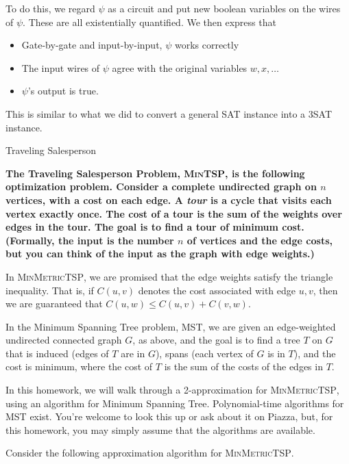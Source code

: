 \documentclass[2pt]{scrartcl}
\makeatletter
\renewcommand{\subsubsection}{\@startsection{subsubsection}{3}{0mm}
  {-1ex plus -.5ex minus -.2ex}
  {1ex plus .2ex}
{\normalfont\small\bfseries}}
\makeatother
\begin{document}
\begin{multicols}{6}
To do this, we regard $\psi$ as a circuit and put new boolean
variables on the wires of $\psi$.  These are all existentially
quantified.  We then express that
\begin{itemize}
\item Gate-by-gate and input-by-input, $\psi$ works correctly
\item The input wires of $\psi$ agree with the original variables
  $w,x,\ldots$
\item $\psi$'s output is true.
\end{itemize}
This is similar to what we did to convert a general SAT instance into
a 3SAT instance.
        
        \subsubsection{Traveling Salesperson}

            {\bf The Traveling Salesperson Problem, \textsc{MinTSP}, is the following
optimization problem.  Consider a complete undirected graph on $n$
vertices, with a cost on each edge.  A {\em tour} is a cycle that
visits each vertex exactly once.  The cost of a tour is the sum of the
weights over edges in the tour.  The goal is to find a tour of minimum
cost.  (Formally, the input is the number $n$ of vertices and the edge
costs, but you can think of the input as the graph with edge weights.)

In \textsc{MinMetricTSP}, we are promised that the edge weights
satisfy the triangle inequality.  That is, if $C(u,v)$ denotes the
cost associated with edge $u,v$, then we are guaranteed that
$C(u,w)\le C(u,v)+C(v,w)$.

In the Minimum Spanning Tree problem, \textsc{MST}, we are given an
edge-weighted undirected connected graph $G$, as above, and the goal
is to find a tree $T$ on $G$ that is induced (edges of $T$ are in
$G$), spans (each vertex of $G$ is in $T$), and the cost is minimum,
where the cost of $T$ is the sum of the costs of the edges in $T$.

In this homework, we will walk through a 2-approximation for
\textsc{MinMetricTSP}, using an algorithm for Minimum Spanning Tree.
Polynomial-time algorithms for \textsc{MST} exist.  You're welcome to
look this up or ask about it on Piazza, but, for this homework, you
may simply assume that the algorithms are available.

Consider the following approximation algorithm for \textsc{MinMetricTSP}.

}
\end{multicols}
\end{document}
